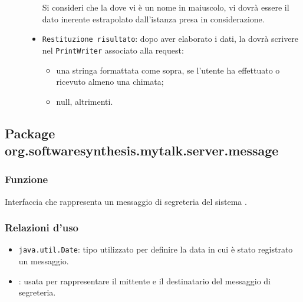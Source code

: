 \begin{description}
\begin{itemize}
		Si consideri che la dove vi è un nome in maiuscolo, vi dovrà essere il dato inerente estrapolato dall'istanza  presa in considerazione.
		\item \texttt{Restituzione risultato}: dopo aver elaborato i dati, la  dovrà scrivere nel \texttt{PrintWriter} associato alla request:
			\begin{itemize}
				\item una stringa formattata come sopra, se l'utente ha effettuato o ricevuto almeno una chimata;
				\item null, altrimenti.
			\end{itemize}
	\end{itemize}

\end{description}

\subsection{Package org.softwaresynthesis.mytalk.server.message}\label{sec:message}


\subsubsection*{Funzione}
Interfaccia che rappresenta un messaggio di segreteria del sistema \caName.

\subsubsection*{Relazioni d'uso}
\begin{itemize}
	\item \texttt{java.util.Date}: tipo utilizzato per definire la data in cui è stato registrato un messaggio.
	\item {}: usata per rappresentare il mittente e il destinatario del messaggio di segreteria.
\end{itemize}

